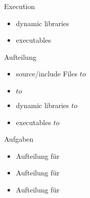 \documentclass{beamer}
\begin{document}
\begin{frame}{Execution}
 \begin{itemize}
  \item dynamic libraries 
  \item executables
 \end{itemize}
\end{frame}

\begin{frame}{Aufteilung}
 \begin{itemize}
  \item source/include Files $to$ \host
  \item {}  $to$ \host
  \item dynamic libraries  $to$ \targetS
  \item executables $to$ \targetS 
 \end{itemize}
\end{frame}

\begin{frame}{Aufgaben}
 \begin{itemize}
  \item Aufteilung für 
  \item Aufteilung für 
  \item Aufteilung für 
 \end{itemize}
\end{frame}
\end{document}
